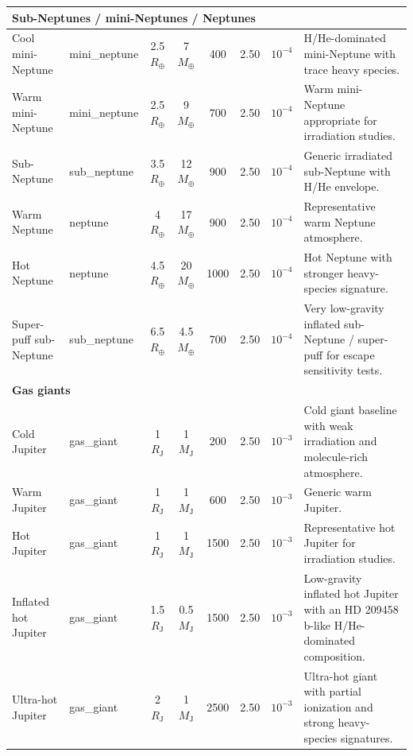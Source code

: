 \begin{longtable}{llcccccl}
\multicolumn{8}{l}{\textbf{Sub-Neptunes / mini-Neptunes / Neptunes}} \\
\midrule
Cool mini-Neptune & mini\_neptune & 2.5 $R_\oplus$ & 7 $M_\oplus$ & 400 & 2.50 & $10^{-4}$ & H/He-dominated mini-Neptune with trace heavy species. \\
Warm mini-Neptune & mini\_neptune & 2.5 $R_\oplus$ & 9 $M_\oplus$ & 700 & 2.50 & $10^{-4}$ & Warm mini-Neptune appropriate for irradiation studies. \\
Sub-Neptune & sub\_neptune & 3.5 $R_\oplus$ & 12 $M_\oplus$ & 900 & 2.50 & $10^{-4}$ & Generic irradiated sub-Neptune with H/He envelope. \\
Warm Neptune & neptune & 4 $R_\oplus$ & 17 $M_\oplus$ & 900 & 2.50 & $10^{-4}$ & Representative warm Neptune atmosphere. \\
Hot Neptune & neptune & 4.5 $R_\oplus$ & 20 $M_\oplus$ & 1000 & 2.50 & $10^{-4}$ & Hot Neptune with stronger heavy-species signature. \\
Super-puff sub-Neptune & sub\_neptune & 6.5 $R_\oplus$ & 4.5 $M_\oplus$ & 700 & 2.50 & $10^{-4}$ & Very low-gravity inflated sub-Neptune / super-puff for escape sensitivity tests. \\
\midrule

\multicolumn{8}{l}{\textbf{Gas giants}} \\
\midrule
Cold Jupiter & gas\_giant & 1 $R_\mathrm{J}$ & 1 $M_\mathrm{J}$ & 200 & 2.50 & $10^{-3}$ & Cold giant baseline with weak irradiation and molecule-rich atmosphere. \\
Warm Jupiter & gas\_giant & 1 $R_\mathrm{J}$ & 1 $M_\mathrm{J}$ & 600 & 2.50 & $10^{-3}$ & Generic warm Jupiter. \\
Hot Jupiter & gas\_giant & 1 $R_\mathrm{J}$ & 1 $M_\mathrm{J}$ & 1500 & 2.50 & $10^{-3}$ & Representative hot Jupiter for irradiation studies. \\
Inflated hot Jupiter & gas\_giant & 1.5 $R_\mathrm{J}$ & 0.5 $M_\mathrm{J}$ & 1500 & 2.50 & $10^{-3}$ & Low-gravity inflated hot Jupiter with an HD 209458 b-like H/He-dominated composition. \\
Ultra-hot Jupiter & gas\_giant & 2 $R_\mathrm{J}$ & 1 $M_\mathrm{J}$ & 2500 & 2.50 & $10^{-3}$ & Ultra-hot giant with partial ionization and strong heavy-species signatures. \\
\midrule

\end{longtable}